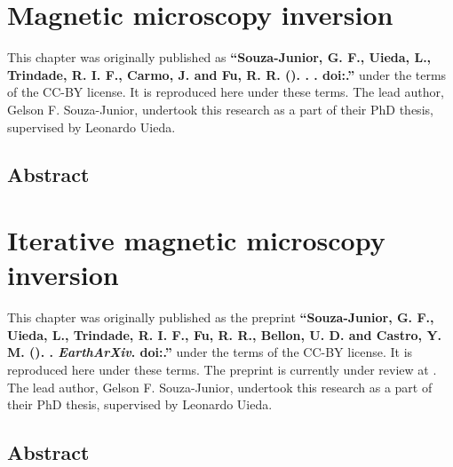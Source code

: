 \documentclass[10pt,a4paper,oneside]{book}
\begin{document}
\chapter{Magnetic microscopy inversion}
\label{chap_micromag}

\begingroup


\begin{summarybox}
    \noindent
    This chapter was originally published as
    \textbf{``Souza-Junior, G. F., Uieda, L., Trindade, R. I. F., Carmo, J. and
        Fu, R. R. (\Year). \Title{}. \textit{\Journal{}}.
    doi:\href{https://doi.org/\JournalDOI}{\JournalDOI}.''} under the
    terms of the CC-BY license. It is reproduced here under these terms.
    The lead author, Gelson F. Souza-Junior, undertook this research as a part
    of their PhD thesis, supervised by Leonardo Uieda.
\end{summarybox}

\section*{Abstract}


% 
\endgroup

\chapter{Iterative magnetic microscopy inversion}
\label{chap_micromag_interf}

\begingroup


\begin{summarybox}
    \noindent
    This chapter was originally published as the preprint
    \textbf{``Souza-Junior, G. F., Uieda, L., Trindade, R. I. F., Fu, R. R.,
    Bellon, U. D. and Castro, Y. M. (\Year). \Title{}. \textit{EarthArXiv}.
    doi:\href{https://doi.org/\PreprintDOI}{\PreprintDOI}.''} under the
    terms of the CC-BY license. It is reproduced here under these terms.
    The preprint is currently under review at \textit{\Journal{}}.
    The lead author, Gelson F. Souza-Junior, undertook this research as a part
    of their PhD thesis, supervised by Leonardo Uieda.
\end{summarybox}

\section*{Abstract}

\end{document}
